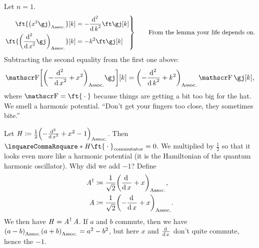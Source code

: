 \documentclass[10pt, a4paper, twoside]{lecturenotes}
\newcommand{\opAdag}{\adj{\opA}}
\begin{document}
\begin{lecture}[date=2013-03-07]
  Let $n=1$.
  \begin{equation*}
    \left.
    \begin{aligned}
      \ft{\pa{x^2\gj}}\of k &= -\derivop[2]{k}\ft\gj\of k \\
      \ft{\pa{\derivop[2]{x}\gj}}\of k &= -k^2 \ft\gj\of k
    \end{aligned}
    \right\rbrace \qquad \text{From the lemma your life depends on.}
  \end{equation*}
  Subtracting the second equality from the first one above:
  \begin{equation*}
    \FT\of{\pa{-\derivop[2]{x}+x^2}\gj}\of k = \pa{-\derivop[2]{k}+k^2}\FT\gj\of k\text{,}
  \end{equation*}
  where $\FT = \ft{\placeholder}$ because things are getting a bit too big for the hat.
  We smell a harmonic potential. ``Don't get your fingers too close, they sometimes bite.''
  
  Let $\opH \DefineAs \frac{1}{2}\pa{-\derivop[2]{x}+x^2-1}$. Then $\commutator \opH {\ft{\placeholder}}=0$. We multiplied by $\frac{1}{2}$ so that it looks even more like a harmonic potential (it is the Hamiltonian of the quantum harmonic oscillator). Why did we add $-1$? Define
  \begin{align*}
    \opAdag &\DefineAs \frac{1}{\sqrt 2}\pa{\derivop{x} + x}\text{,}\\
    \opA &\DefineAs \frac{1}{\sqrt 2}\pa{-\derivop{x} + x}\text{.}
  \end{align*}
  We then have $\opH = \opAdag\opA$. If $a$ and $b$ commute, then we have $\pa{a-b}\pa{a+b}  = a^2-b^2$, but here $x$ and $\frac{\operatorname{d}^{} {}}{{\operatorname{d} {x}}^{}}$ don't quite commute, hence the $-1$.
\end{lecture}
\end{document}
